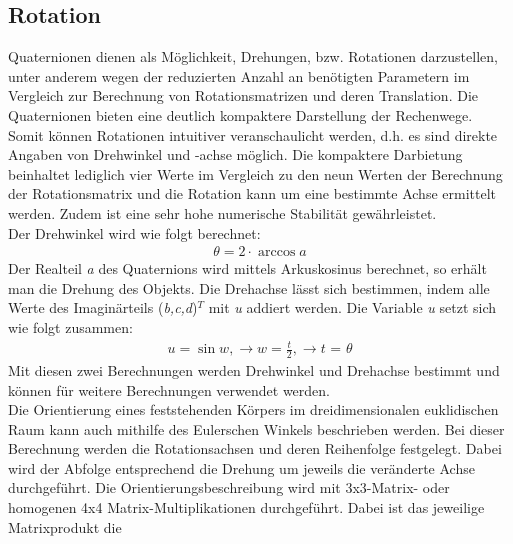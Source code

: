 \subsection{Rotation}
Quaternionen dienen als Möglichkeit, Drehungen, bzw. Rotationen darzustellen, unter anderem wegen der reduzierten Anzahl an 
benötigten Parametern im Vergleich zur Berechnung von Rotationsmatrizen und deren Translation. Die Quaternionen bieten eine deutlich kompaktere 
Darstellung der Rechenwege. Somit können Rotationen intuitiver veranschaulicht werden, d.h. es sind direkte Angaben von Drehwinkel und 
-achse möglich. Die kompaktere Darbietung beinhaltet lediglich vier Werte im Vergleich zu den neun Werten der Berechnung der Rotationsmatrix
und die Rotation kann um eine bestimmte Achse ermittelt werden. Zudem ist eine sehr hohe numerische Stabilität gewährleistet. 
\\ 
Der Drehwinkel wird wie folgt berechnet: \cite{quaternionRichter.2020m}
\begin{align}
    \textit{$\theta$} = \textit{2} \cdot \textit{$\arccos a$}
\end{align}
Der Realteil \textit{a} des Quaternions wird mittels Arkuskosinus berechnet, so erhält man die Drehung des Objekts. Die Drehachse lässt sich 
bestimmen, indem alle Werte des Imaginärteils (\textit{b,c,d})$^T$ mit \textit{u} addiert werden. Die Variable \textit{u} setzt sich wie 
folgt zusammen:  \cite{quaternionRichter.2020m}
\begin{align}
    \textit{u} = \textit{$\sin w$}, \to \textit{w} = \frac{t}{2}, \to \textit{t = $\theta$}
\end{align}
Mit diesen zwei Berechnungen werden Drehwinkel und Drehachse bestimmt und können für weitere Berechnungen verwendet werden.
\\ 
\linebreak 
Die Orientierung eines feststehenden Körpers im dreidimensionalen euklidischen Raum kann auch mithilfe des Eulerschen Winkels beschrieben werden. Bei dieser 
Berechnung werden die Rotationsachsen und deren Reihenfolge festgelegt. Dabei wird der Abfolge entsprechend die Drehung um jeweils die veränderte Achse durchgeführt. 
Die Orientierungsbeschreibung wird mit 3x3-Matrix- oder homogenen 4x4 Matrix-Multiplikationen durchgeführt. Dabei ist das jeweilige Matrixprodukt die 
